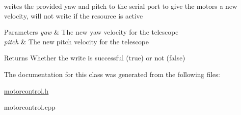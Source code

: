 writes the provided yaw and pitch to the serial port to give the motors a new velocity, will not write if the resource is active 


\begin{DoxyParams}{Parameters}
{\em yaw} & The new yaw velocity for the telescope \\
\hline
{\em pitch} & The new pitch velocity for the telescope \\
\hline
\end{DoxyParams}
\begin{DoxyReturn}{Returns}
Whether the write is successful (true) or not (false) 
\end{DoxyReturn}


The documentation for this class was generated from the following files\+:\begin{DoxyCompactItemize}
\item 
\mbox{\hyperlink{motorcontrol_8h}{motorcontrol.\+h}}\item 
motorcontrol.\+cpp\end{DoxyCompactItemize}
